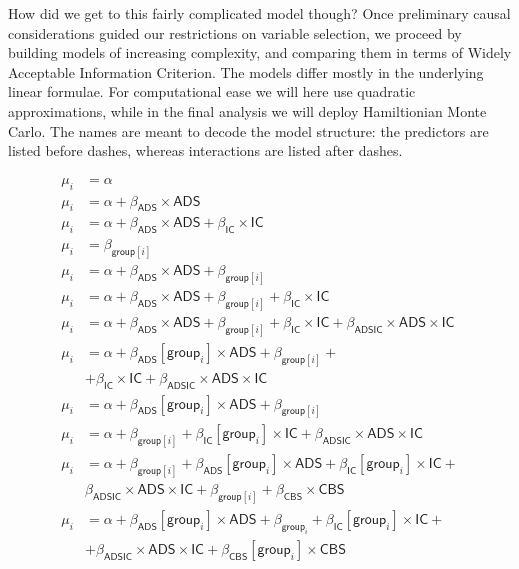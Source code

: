 \documentclass[10pt,dvipsnames,enabledeprecatedfontcommands]{scrartcl}
\begin{document}
How did we get to this fairly complicated model though? Once preliminary
causal considerations guided our restrictions on variable selection, we
proceed by building models of increasing complexity, and comparing them
in terms of Widely Acceptable Information Criterion. The models differ
mostly in the underlying linear formulae. For computational ease we will
here use quadratic approximations, while in the final analysis we will
deploy Hamiltionian Monte Carlo. The names are meant to decode the model
structure: the predictors are listed before dashes, whereas interactions
are listed after dashes.

\begin{align}
\tag{Null}  \mu_i & = \alpha\\
\tag{ADS}  \mu_i & = \alpha + \beta_{\mathsf{ADS}}\times \mathsf{ADS}\\
\tag{ADSIC}  \mu_i & = \alpha + \beta_{\mathsf{ADS}}\times \mathsf{ADS} +    \beta_{\mathsf{IC}}\times \mathsf{IC}\\
\tag{IT}  \mu_i & = \beta_{\mathsf{group}[i]} \\
\tag{ADSIT} \mu_i & = \alpha + \beta_{\mathsf{ADS}}\times \mathsf{ADS} +  \beta_{\mathsf{group}[i]}\\
\tag{ADSITIC} \mu_i & = \alpha + \beta_{\mathsf{ADS}}\times \mathsf{ADS} +  \beta_{\mathsf{group}[i]} +    \beta_{\mathsf{IC}}\times \mathsf{IC}\\
\tag{ADSITIC-ADSIC} \mu_i & = \alpha + \beta_{\mathsf{ADS}}\times \mathsf{ADS} +  \beta_{\mathsf{group}[i]} +    \beta_{\mathsf{IC}}\times \mathsf{IC} + \beta_{\mathsf{ADSIC}}\times \mathsf{ADS} \times \mathsf{IC}\\
\tag{ADSITIT-ADSIC-ADSIT} \mu_i & = \alpha + \beta_{\mathsf{ADS}}[\mathsf{group}_i]\times \mathsf{ADS} +  \beta_{\mathsf{group}[i]} +  \\ \nonumber & +  \beta_{\mathsf{IC}}\times \mathsf{IC} + \beta_{\mathsf{ADSIC}}\times \mathsf{ADS} \times \mathsf{IC}\\
\tag{ADSIT-ADSIT}   \mu_i &  = \alpha + \beta_{\mathsf{ADS}}[\mathsf{group}_i] \times
 \mathsf{ADS} + \beta_{\mathsf{group}[i]} \\
\tag{ADSITIC-ADSIT-ICIT-ADSIC}   \mu_i &  = \alpha  + \beta_{\mathsf{group}[i]} +  
\beta_{\mathsf{IC}}[\mathsf{group}_i] \times \mathsf{IC}  + \beta_{\mathsf{ADSIC}}\times \mathsf{ADS} \times \mathsf{IC}\\
\tag{ADSITICCBS-ITIC-ADSIC} \mu_i &  = \alpha  + \beta_{\mathsf{group}[i]} +  
\beta_{\mathsf{ADS}}[\mathsf{group}_i] \times
 \mathsf{ADS}  + \beta_{\mathsf{IC}}[\mathsf{group}_i] \times \mathsf{IC}  + \\ & \nonumber  \beta_{\mathsf{ADSIC}}\times \mathsf{ADS} \times \mathsf{IC} +
 \beta_{\mathsf{group}[i]} +  
\beta_{\mathsf{CBS}} \times \mathsf{CBS} \\
\tag{Final} \mu_i & = \alpha + \beta_{\mathsf{ADS}}[\mathsf{group}_i]\times \mathsf{ADS} + \beta_{\mathsf{group}_i}  +  \beta_{\mathsf{IC}}[\mathsf{group}_i]\times \mathsf{IC} + \\
 & + \beta_{\mathsf{ADSIC}}\times \mathsf{ADS} \times \mathsf{IC} + \beta_{\mathsf{CBS}}[\mathsf{group}_i] \times \mathsf{CBS} \nonumber \end{align}
\end{document}
